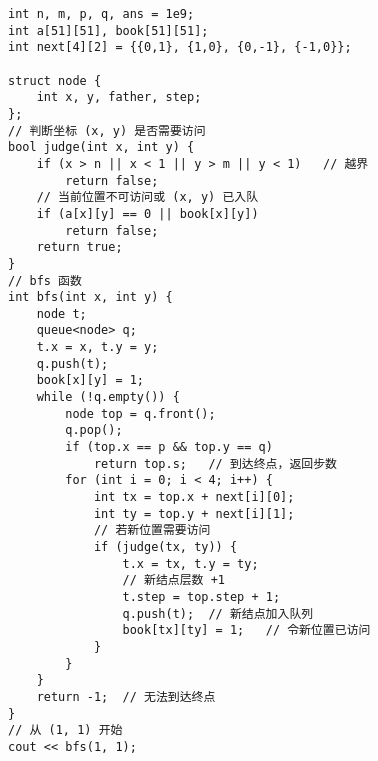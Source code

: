 \begin{lstlisting}
int n, m, p, q, ans = 1e9;
int a[51][51], book[51][51];
int next[4][2] = {{0,1}, {1,0}, {0,-1}, {-1,0}};

struct node {
	int x, y, father, step;
};
// 判断坐标 (x, y) 是否需要访问
bool judge(int x, int y) {
	if (x > n || x < 1 || y > m || y < 1)	// 越界
		return false;
	// 当前位置不可访问或 (x, y) 已入队
	if (a[x][y] == 0 || book[x][y])
		return false;
	return true;
}
// bfs 函数
int bfs(int x, int y) {
	node t;
	queue<node> q;
	t.x = x, t.y = y;
	q.push(t);
	book[x][y] = 1;
	while (!q.empty()) {
		node top = q.front();
		q.pop();
		if (top.x == p && top.y == q)
			return top.s;	// 到达终点，返回步数
		for (int i = 0; i < 4; i++) {
			int tx = top.x + next[i][0];
			int ty = top.y + next[i][1];
			// 若新位置需要访问
			if (judge(tx, ty)) {
				t.x = tx, t.y = ty;
				// 新结点层数 +1
				t.step = top.step + 1;
				q.push(t);	// 新结点加入队列
				book[tx][ty] = 1;	// 令新位置已访问
			}
		}
	}
	return -1;	// 无法到达终点
}
// 从 (1, 1) 开始
cout << bfs(1, 1);
\end{lstlisting}






